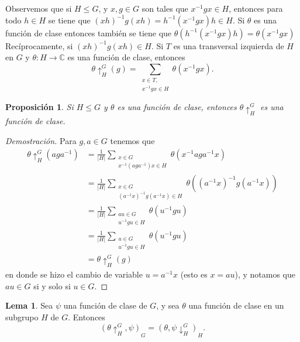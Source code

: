 \documentclass[12pt]{book}
\newtheorem{proposition}[theorem]{Proposición}
\theoremstyle{definition}
\newtheorem{lemma}[theorem]{Lema}
\newcounter{in}
\begin{document}
Observemos que si $H\leq G$, y $x,g\in G$ son tales que
$x^{-1}gx\in H$, entonces para todo $h\in H$ se tiene que
$(xh)^{-1}g(xh)=h^{-1}(x^{-1}gx)h\in H$. Si $\theta$ es una función de
clase entonces también se tiene que
$\theta(h^{-1}(x^{-1}gx)h)=\theta(x^{-1}gx)$ Recíprocamente, si
$(xh)^{-1}g(xh)\in H$. Si $T$ es una transversal izquierda de $H$ en
$G$ y $\theta:H\rightarrow\mathbb{C}$ es una función de clase,
entonces
\begin{equation}
  \label{fun-ind-trans}
  \theta\uparrow^{G}_{H}(g)=\sum_{\substack{x\in T,\\x^{-1}gx\in H}}\theta(x^{-1}gx).
\end{equation}
\begin{proposition}
  Si $H\leq G$ y $\theta$ es una función de
  clase, entonces $\theta\uparrow^{G}_{H}$ es
  una función de clase. 
\end{proposition}
\begin{proof}[Demostración]
  Para $g,a\in G$ tenemos que
  \begin{align*}
    \theta\uparrow^{G}_{H}(aga^{-1})&=\frac{1}{|H|}\sum_{\substack{x\in
        G\\x^{-1}(aga^{-1})x\in H}}\theta(x^{-1}aga^{-1}x)\\
    &=\frac{1}{|H|}\sum_{\substack{x\in
        G\\(a^{-1}x)^{-1}g(a^{-1}x)\in H}}\theta((a^{-1}x)^{-1}g(a^{-1}x))\\
    &=\frac{1}{|H|}\sum_{\substack{au\in
        G\\u^{-1}gu\in H}}\theta(u^{-1}gu)\\
     &=\frac{1}{|H|}\sum_{\substack{u\in
        G\\u^{-1}gu\in H}}\theta(u^{-1}gu)\\
    &=\theta\uparrow^{G}_{H}(g)
  \end{align*}
en donde se hizo el cambio de variable $u=a^{-1}x$ (esto es $x=au$), y notamos
que $au\in G$ si y solo si $u\in G$.
\end{proof}
\begin{lemma}
  \label{l5_1}
  Sea $\psi$ una función de clase de $G$, y sea $\theta$ una función
  de clase en un subgrupo $H$ de $G$. Entonces
  \begin{equation*}
    (\theta \uparrow^{G}_{H},\psi)_{G}= (\theta,\psi\downarrow^{G}_{H})_{H} .
  \end{equation*}
\end{lemma} 
\end{document}
